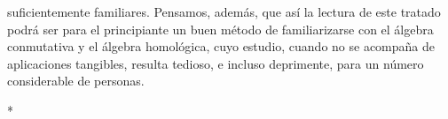 suficientemente familiares.
Pensamos, además, que así la lectura de este tratado podrá ser para el principiante un buen método de familiarizarse con el álgebra conmutativa y el álgebra homológica, cuyo estudio, cuando no se acompaña de aplicaciones tangibles, resulta tedioso, e incluso deprimente, para un número considerable de personas.

\bigskip
\begin{center}*\quad*\quad*\end{center}
\bigskip
